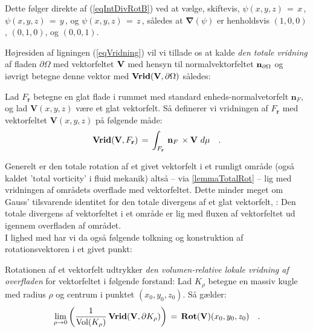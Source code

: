 \begin{bevis}
Dette følger direkte af  (\ref{eqIntDivRotB}) ved
at vælge, skiftevis, $\psi(x,y,z) \, = \, x\,$,
$\psi(x,y,z) \, = \, y\,$, og $\psi(x,y,z) \, =
\, z\,$, således at $\bm{\nabla}(\psi)$ er henholdsvis
$(1,0,0)$, $(0,1,0)$, og $(0,0,1)$.
\end{bevis}

Højresiden af ligningen (\ref{eqVridning}) vil vi
tillade os at kalde {\em{den totale {vridning}}} af
fladen $\partial \Omega$ med vektorfeltet
$\bf{V}$ med hensyn til normalvektorfeltet
${\bf{n}}_{\partial \Omega}$ og iøvrigt betegne
denne vektor med ${\operatorname{\bf{Vrid}}}({\bf{V}},
\partial \Omega)$ således:

\begin{definition}[Vridning]\label{defVridning}
Lad $F_{\mathbf{r}}$ betegne en glat flade i rummet med standard enheds-normalvetorfelt $\mathbf{n}_{F}$, og lad $\mathbf{V}(x,y,z)$ være et glat vektorfelt. Så definerer vi vridningen af $F_{\mathbf{r}}$ med vektorfeltet $\mathbf{V}(x,y,z)$ på følgende måde:
\begin{equation}
{\operatorname{\bf{Vrid}}}({\bf{V}},
F_{\mathbf{r}}) \, = \, \int_{F_{\mathbf{r}}}\, {\bf{n}}_{F}\, \times {\bf{V}}
 \, \,d\mu  \quad .
\end{equation}
\end{definition}

Generelt er den totale rotation af et givet vektorfelt i et rumligt område (også kaldet
'total vorticity' i fluid mekanik) altså --  via \ref{lemmaTotalRot} -- lig
med vridningen af områdets overflade med vektorfeltet. Dette minder meget om  Gauss' tilsvarende
identitet for den totale divergens af et glat vektorfelt, : Den totale divergens af vektorfeltet i et
område er lig med fluxen af vektorfeltet ud igennem overfladen
af området. \\

I lighed med 
har vi da også følgende tolkning og konstruktion
af rotationsvektoren i et givet punkt:

\begin{theorem} \label{thmRotGeom}
Rotationen af et vektorfelt udtrykker {\em{den
{volumen-relative lokale vridning} af overfladen}}
for vektorfeltet i følgende forstand: Lad
$K_{\rho}$ betegne en massiv kugle med radius
$\rho$ og centrum i punktet $(x_{0}, y_{0},
z_{0})$. Så gælder:
\begin{equation} \label{eqVridRot}
\lim_{\rho \to 0}\left(
\frac{1}{\operatorname{Vol}(K_{\rho})}\,{\operatorname{\bf{Vrid}}}({\bf{V}},
\partial K_{\rho})\right) \, =  \,
\operatorname{\mathbf{Rot}}({\bf{V}})(x_{0}, y_{0}, z_{0}) \quad .
\end{equation}
\end{theorem}

